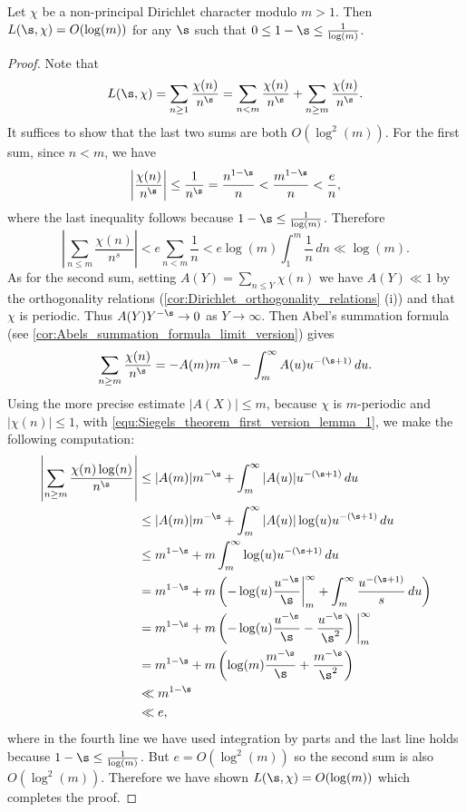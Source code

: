     \begin{lemma}\label{lem:Siegels_theorem_first_version_lemma}
      Let $\chi$ be a non-principal Dirichlet character modulo $m > 1$. Then $L(\s,\chi) = O(\log(m))$ for any $\s$ such that $0 \le 1-\s \le \frac{1}{\log(m)}$.
    \end{lemma}
    \begin{proof}
      Note that
      \[
        L(\s,\chi) = \sum_{n \ge 1}\frac{\chi(n)}{n^{\s}} = \sum_{n < m}\frac{\chi(n)}{n^{\s}}+\sum_{n \ge m}\frac{\chi(n)}{n^{\s}}.
      \]
      It suffices to show that the last two sums are both $O(\log^{2}(m))$. For the first sum, since $n < m$, we have
      \[
        \left|\frac{\chi(n)}{n^{\s}}\right| \le \frac{1}{n^{\s}} = \frac{n^{1-\s}}{n} < \frac{m^{1-\s}}{n} < \frac{e}{n},
      \]
      where the last inequality follows because $1-\s \le \frac{1}{\log(m)}$. Therefore
      \[
        \left|\sum_{n \le m}\frac{\chi(n)}{n^{s}}\right| < e\sum_{n < m}\frac{1}{n} < e\log(m)\int_{1}^{m}\frac{1}{n}\,dn \ll \log(m).
      \]
      As for the second sum, setting $A(Y) = \sum_{n \le Y}\chi(n)$ we have $A(Y) \ll 1$ by the orthogonality relations (\cref{cor:Dirichlet_orthogonality_relations} (i)) and that $\chi$ is periodic. Thus $A(Y)Y^{-\s} \to 0$ as $Y \to \infty$. Then Abel's summation formula (see \cref{cor:Abels_summation_formula_limit_version}) gives
      \begin{equation}\label{equ:Siegels_theorem_first_version_lemma_1}
        \sum_{n \ge m}\frac{\chi(n)}{n^{\s}} = -A(m)m^{-\s}-\int_{m}^{\infty}A(u)u^{-(\s+1)}\,du.
      \end{equation}
      Using the more precise estimate $|A(X)| \le m$, because $\chi$ is $m$-periodic and $|\chi(n)| \le 1$, with \cref{equ:Siegels_theorem_first_version_lemma_1}, we make the following computation:
      \begin{align*}
        \left|\sum_{n \ge m}\frac{\chi(n)\log(n)}{n^{\s}}\right| &\le |A(m)|m^{-\s}+\int_{m}^{\infty}|A(u)|u^{-(\s+1)}\,du \\
        &\le |A(m)|m^{-\s}+\int_{m}^{\infty}|A(u)|\log(u)u^{-(\s+1)}\,du \\
        &\le m^{1-\s}+m\int_{m}^{\infty}\log(u)u^{-(\s+1)}\,du \\
        &= m^{1-\s}+m\left(-\log(u)\frac{u^{-\s}}{\s}\bigg|_{m}^{\infty}+\int_{m}^{\infty}\frac{u^{-(\s+1)}}{s}\,du\right) \\
        &= m^{1-\s}+m\left(-\log(u)\frac{u^{-\s}}{\s}-\frac{u^{-\s}}{\s^{2}}\right)\bigg|_{m}^{\infty} \\
        &= m^{1-\s}+m\left(\log(m)\frac{m^{-\s}}{\s}+\frac{m^{-\s}}{\s^{2}}\right) \\
        &\ll m^{1-\s} \\
        &\ll e,
      \end{align*}
      where in the fourth line we have used integration by parts and the last line holds because $1-\s \le \frac{1}{\log(m)}$. But $e = O(\log^{2}(m))$ so the second sum is also $O(\log^{2}(m))$. Therefore we have shown $L(\s,\chi) = O(\log(m))$ which completes the proof.
    \end{proof}

